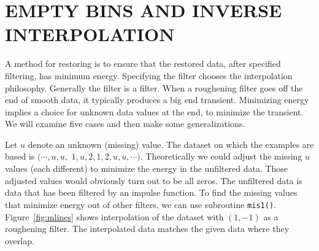 \section{EMPTY BINS AND INVERSE INTERPOLATION}
\par
A method for restoring  is to ensure that the restored data,
after specified filtering, has minimum energy.
Specifying the filter chooses the interpolation philosophy.
Generally the filter is a  filter.
When a roughening filter goes off the end of smooth data,
it typically produces a big end transient.
Minimizing energy implies a choice for unknown data values
at the end, to minimize the transient.
We will examine five cases and then make some generalizations.
\par
{}
\par
Let $u$ denote an unknown (missing) value.
The dataset on which the examples are based is
$(\cdots, u, u,$ 
$1, u, 2, 1, 2, u, u, \cdots )$.
Theoretically we could adjust the missing $u$ values (each different)
to minimize the energy in the unfiltered data.
Those adjusted values would obviously turn out to be all zeros.
The unfiltered data is data that has been filtered by
an impulse function.
To find the missing values
that minimize energy out of other filters,
we can use subroutine \texttt{mis1()}.
Figure~\ref{fig:mlines}
shows interpolation of the dataset with $(1,-1)$ as a roughening filter.
The interpolated data matches the given data where they overlap.%
